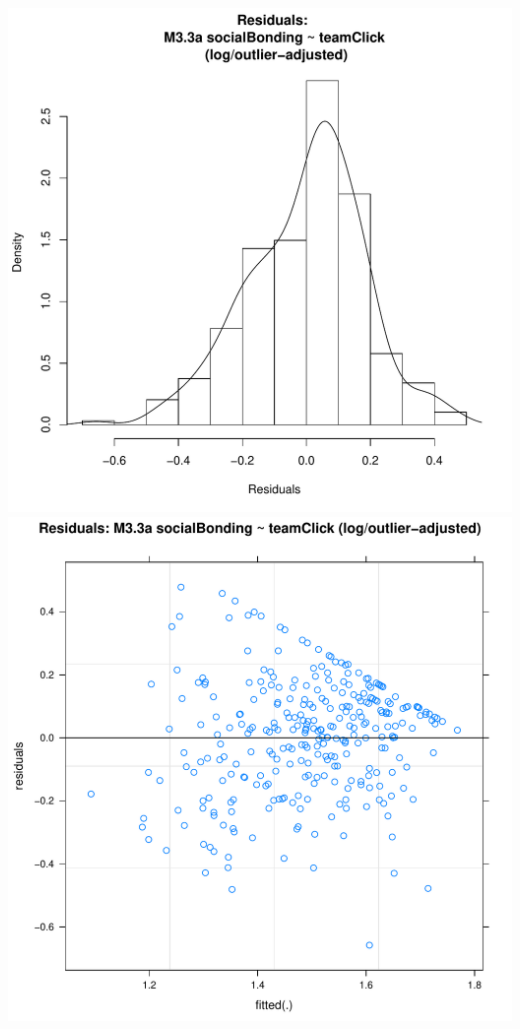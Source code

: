 \documentclass[12pt]{report}
\begin{document}
\includegraphics[scale =0.4]{../images/MLM33aOutLogHist.pdf}
\includegraphics[scale =0.4]{../images/MLM33aOutLogScatter.pdf}
\end{document}

